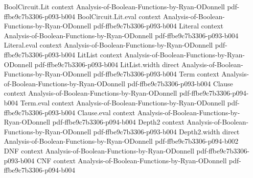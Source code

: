 \begin{theorem}
\leanok
{}
\proofstep
  {BoolCircuit.Lit}
  {context}
  {Analysis-of-Boolean-Functions-by-Ryan-ODonnell}
  {pdf-ffbe9c7b3306-p093-b004}
\proofstep
  {BoolCircuit.Lit.eval}
  {context}
  {Analysis-of-Boolean-Functions-by-Ryan-ODonnell}
  {pdf-ffbe9c7b3306-p093-b004}
\proofstep
  {Literal}
  {context}
  {Analysis-of-Boolean-Functions-by-Ryan-ODonnell}
  {pdf-ffbe9c7b3306-p093-b004}
\proofstep
  {Literal.eval}
  {context}
  {Analysis-of-Boolean-Functions-by-Ryan-ODonnell}
  {pdf-ffbe9c7b3306-p093-b004}
\proofstep
  {LitList}
  {context}
  {Analysis-of-Boolean-Functions-by-Ryan-ODonnell}
  {pdf-ffbe9c7b3306-p093-b004}
\proofstep
  {LitList.width}
  {direct}
  {Analysis-of-Boolean-Functions-by-Ryan-ODonnell}
  {pdf-ffbe9c7b3306-p093-b004}
\proofstep
  {Term}
  {context}
  {Analysis-of-Boolean-Functions-by-Ryan-ODonnell}
  {pdf-ffbe9c7b3306-p093-b004}
\proofstep
  {Clause}
  {context}
  {Analysis-of-Boolean-Functions-by-Ryan-ODonnell}
  {pdf-ffbe9c7b3306-p094-b004}
\proofstep
  {Term.eval}
  {context}
  {Analysis-of-Boolean-Functions-by-Ryan-ODonnell}
  {pdf-ffbe9c7b3306-p093-b004}
\proofstep
  {Clause.eval}
  {context}
  {Analysis-of-Boolean-Functions-by-Ryan-ODonnell}
  {pdf-ffbe9c7b3306-p094-b004}
\proofstep
  {Depth2}
  {context}
  {Analysis-of-Boolean-Functions-by-Ryan-ODonnell}
  {pdf-ffbe9c7b3306-p093-b004}
\proofstep
  {Depth2.width}
  {direct}
  {Analysis-of-Boolean-Functions-by-Ryan-ODonnell}
  {pdf-ffbe9c7b3306-p094-b002}
\proofstep
  {DNF}
  {context}
  {Analysis-of-Boolean-Functions-by-Ryan-ODonnell}
  {pdf-ffbe9c7b3306-p093-b004}
\proofstep
  {CNF}
  {context}
  {Analysis-of-Boolean-Functions-by-Ryan-ODonnell}
  {pdf-ffbe9c7b3306-p094-b004}

\end{theorem}
